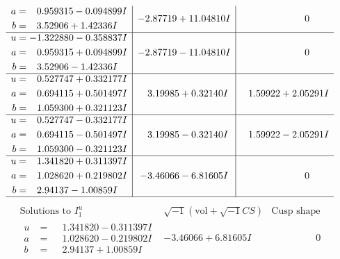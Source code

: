 \documentclass[1p]{elsarticle_modified}
\theoremstyle{definition}
\newcommand{\I}{\sqrt{-1}}
\begin{document}
$$\begin{array}{c|c|c}
\begin{aligned}
a &= \phantom{-}0.959315 - 0.094899 I \\
b &= \phantom{-}3.52906 + 1.42336 I\end{aligned}
 & -2.87719 + 11.04810 I & \phantom{-0.000000 } 0 \\ \hline\begin{aligned}
u &= -1.322880 - 0.358837 I \\
a &= \phantom{-}0.959315 + 0.094899 I \\
b &= \phantom{-}3.52906 - 1.42336 I\end{aligned}
 & -2.87719 - 11.04810 I & \phantom{-0.000000 } 0 \\ \hline\begin{aligned}
u &= \phantom{-}0.527747 + 0.332177 I \\
a &= \phantom{-}0.694115 + 0.501497 I \\
b &= \phantom{-}1.059300 + 0.321123 I\end{aligned}
 & \phantom{-}3.19985 + 0.32140 I & \phantom{-}1.59922 + 2.05291 I \\ \hline\begin{aligned}
u &= \phantom{-}0.527747 - 0.332177 I \\
a &= \phantom{-}0.694115 - 0.501497 I \\
b &= \phantom{-}1.059300 - 0.321123 I\end{aligned}
 & \phantom{-}3.19985 - 0.32140 I & \phantom{-}1.59922 - 2.05291 I \\ \hline\begin{aligned}
u &= \phantom{-}1.341820 + 0.311397 I \\
a &= \phantom{-}1.028620 + 0.219802 I \\
b &= \phantom{-}2.94137 - 1.00859 I\end{aligned}
 & -3.46066 - 6.81605 I & \phantom{-0.000000 } 0\\
 \hline 
 \end{array}$$\newpage$$\begin{array}{c|c|c}  
\text{Solutions to }I^u_{1}& \I (\text{vol} + \sqrt{-1}CS) & \text{Cusp shape}\\
 \hline 
\begin{aligned}
u &= \phantom{-}1.341820 - 0.311397 I \\
a &= \phantom{-}1.028620 - 0.219802 I \\
b &= \phantom{-}2.94137 + 1.00859 I\end{aligned}
 & -3.46066 + 6.81605 I & \phantom{-0.000000 } 0 \\ \hline\begin{aligned}

\end{aligned}
\end{array}$$
\end{document}
